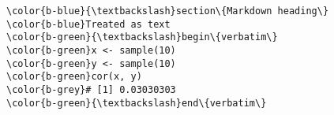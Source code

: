 \documentclass[class=minimal,border=0]{standalone}
\begin{document}
%
\begin{BVerbatim}[bgcolor=b-darkgrey]
\color{b-blue}{\textbackslash}section\{Markdown heading\}
\color{b-blue}Treated as text
\color{b-green}{\textbackslash}begin\{verbatim\}
\color{b-green}x <- sample(10)
\color{b-green}y <- sample(10)
\color{b-green}cor(x, y)
\color{b-grey}# [1] 0.03030303
\color{b-green}{\textbackslash}end\{verbatim\}
\end{BVerbatim}
\end{document}
